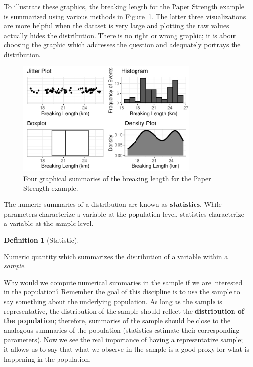 \documentclass[
  letterpaper,
  DIV=11,
  numbers=noendperiod]{scrreprt}
\theoremstyle{definition}
\newtheorem{definition}{Definition}[chapter]
\theoremstyle{definition}
\theoremstyle{plain}
\theoremstyle{remark}
\begin{document}
To illustrate these graphics, the breaking length for the Paper Strength
example is summarized using various methods in
Figure~\ref{fig-summaries-univariate}. The latter three visualizations
are more helpful when the dataset is very large and plotting the raw
values actually hides the distribution. There is no right or wrong
graphic; it is about choosing the graphic which addresses the question
and adequately portrays the distribution.

\begin{figure}

{\centering \includegraphics[width=0.8\textwidth,height=\textheight]{./images/fig-summaries-univariate-1.pdf}

}

\caption{\label{fig-summaries-univariate}Four graphical summaries of the
breaking length for the Paper Strength example.}

\end{figure}

The numeric summaries of a distribution are known as
\textbf{statistics}. While parameters characterize a variable at the
population level, statistics characterize a variable at the sample
level.

\begin{definition}[Statistic]\protect\hypertarget{def-statistic}{}\label{def-statistic}

Numeric quantity which summarizes the distribution of a variable within
a \emph{sample}.

\end{definition}

Why would we compute numerical summaries in the sample if we are
interested in the population? Remember the goal of this discipline is to
use the sample to say something about the underlying population. As long
as the sample is representative, the distribution of the sample should
reflect the \textbf{distribution of the population}; therefore,
summaries of the sample should be close to the analogous summaries of
the population (statistics estimate their corresponding parameters). Now
we see the real importance of having a representative sample; it allows
us to say that what we observe in the sample is a good proxy for what is
happening in the population.
\end{document}
